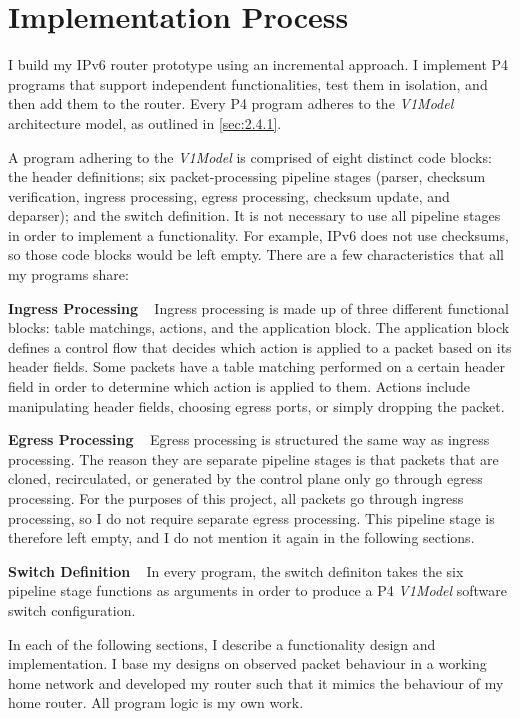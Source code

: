\pagebreak

\section{Implementation Process}
\label{sec:3.3}

I build my IPv6 router prototype using an incremental approach. I implement P4 programs that support independent functionalities, test them in isolation, and then add them to the router. Every P4 program adheres to the \textit{V1Model} architecture model, as outlined in \cref{sec:2.4.1}.

A program adhering to the \textit{V1Model} is comprised of eight distinct code blocks: the header definitions; six packet-processing pipeline stages (parser, checksum verification, ingress processing, egress processing, checksum update, and deparser); and the switch definition. It is not necessary to use all pipeline stages in order to implement a functionality. For example, IPv6 does not use checksums, so those code blocks would be left empty. There are a few characteristics that all my programs share:

\textbf{Ingress Processing} ~ Ingress processing is made up of three different functional blocks: table matchings, actions, and the application block. The application block defines a control flow that decides which action is applied to a packet based on its header fields. Some packets have a table matching performed on a certain header field in order to determine which action is applied to them. Actions include manipulating header fields, choosing egress ports, or simply dropping the packet.

\textbf{Egress Processing} ~ Egress processing is structured the same way as ingress processing. The reason they are separate pipeline stages is that packets that are cloned, recirculated, or generated by the control plane only go through egress processing. For the purposes of this project, all packets go through ingress processing, so I do not require separate egress processing. This pipeline stage is therefore left empty, and I do not mention it again in the following sections.

\textbf{Switch Definition} ~ In every program, the switch definiton takes the six pipeline stage functions as arguments in order to produce a P4 \textit{V1Model} software switch configuration.

In each of the following sections, I describe a functionality design and implementation. I base my designs on observed packet behaviour in a working home network and developed my router such that it mimics the behaviour of my home router. All program logic is my own work.



